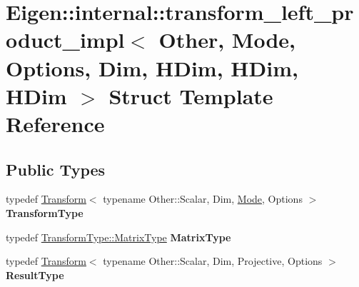 \hypertarget{struct_eigen_1_1internal_1_1transform__left__product__impl_3_01_other_00_01_mode_00_01_options_0d7a5c2fda4fe7320ea55777493bf1a2a}{}\section{Eigen\+::internal\+::transform\+\_\+left\+\_\+product\+\_\+impl$<$ Other, Mode, Options, Dim, H\+Dim, H\+Dim, H\+Dim $>$ Struct Template Reference}
\label{struct_eigen_1_1internal_1_1transform__left__product__impl_3_01_other_00_01_mode_00_01_options_0d7a5c2fda4fe7320ea55777493bf1a2a}
\subsection*{Public Types}
\begin{DoxyCompactItemize}
\item 
\mbox{\label{struct_eigen_1_1internal_1_1transform__left__product__impl_3_01_other_00_01_mode_00_01_options_0d7a5c2fda4fe7320ea55777493bf1a2a_a42e7b92624668c31f9256178adda0ffd}} 
typedef \mbox{\hyperlink{class_eigen_1_1_transform}{Transform}}$<$ typename Other\+::\+Scalar, Dim, \mbox{\hyperlink{struct_mode}{Mode}}, Options $>$ {\bfseries Transform\+Type}
\item 
\mbox{\label{struct_eigen_1_1internal_1_1transform__left__product__impl_3_01_other_00_01_mode_00_01_options_0d7a5c2fda4fe7320ea55777493bf1a2a_a2f3e715a9d5f75c06a8bbf3b8da97a35}} 
typedef \mbox{\hyperlink{class_eigen_1_1_transform_a30f72ba46abc2bb3c7fa919c1078fc9c}{Transform\+Type\+::\+Matrix\+Type}} {\bfseries Matrix\+Type}
\item 
\mbox{\label{struct_eigen_1_1internal_1_1transform__left__product__impl_3_01_other_00_01_mode_00_01_options_0d7a5c2fda4fe7320ea55777493bf1a2a_a38cc6c0dabbab7549c37bd8c1fbfbd18}} 
typedef \mbox{\hyperlink{class_eigen_1_1_transform}{Transform}}$<$ typename Other\+::\+Scalar, Dim, Projective, Options $>$ {\bfseries Result\+Type}
\end{DoxyCompactItemize}
